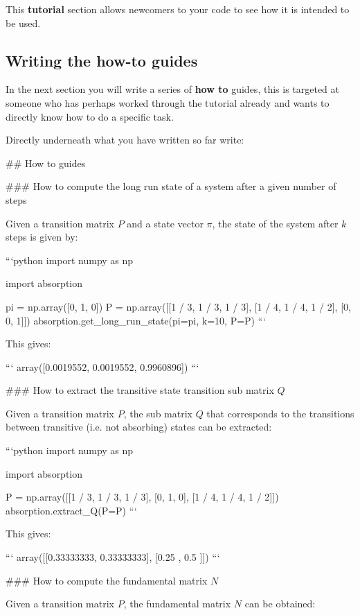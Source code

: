 This \textbf{tutorial} section allows newcomers to your code to see how it is intended
to be used.

\subsection{Writing the how-to guides}
\label{\detokenize{building-tools/06-documentation/tutorial/main:writing-the-how-to-guides}}

In the next section you will write a series of \textbf{how to} guides, this is
targeted
at someone who has perhaps worked through the tutorial already and wants to
directly know how to do a specific task.

Directly underneath what you have written so far write:

\begin{md}

## How to guides

### How to compute the long run state of a system after a given number of steps

Given a transition matrix $P$ and a state vector $\pi$, the state of the system
after $k$ steps is given by:

```python
import numpy as np

import absorption

pi = np.array([0, 1, 0])
P = np.array([[1 / 3, 1 / 3, 1 / 3], [1 / 4, 1 / 4, 1 / 2], [0, 0, 1]])
absorption.get_long_run_state(pi=pi, k=10, P=P)
```

This gives:

```
array([0.0019552, 0.0019552, 0.9960896])
```

### How to extract the transitive state transition sub matrix $Q$

Given a transition matrix $P$, the sub matrix $Q$ that
corresponds to the transitions between transitive (i.e. not absorbing) states can
be extracted:

```python
import numpy as np

import absorption

P = np.array([[1 / 3, 1 / 3, 1 / 3], [0, 1, 0], [1 / 4, 1 / 4, 1 / 2]])
absorption.extract_Q(P=P)
```

This gives:

```
array([[0.33333333, 0.33333333],
       [0.25      , 0.5       ]])
```

### How to compute the fundamental matrix $N$

Given a transition matrix $P$, the fundamental matrix $N$
can be obtained:


\end{md}
